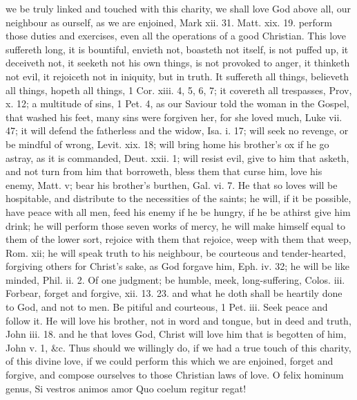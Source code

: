 {we be truly linked and touched with this charity, we shall love God
above all, our neighbour as ourself, as we are enjoined, Mark xii. 31.
Matt. xix. 19. perform those duties and exercises, even all the
operations of a good Christian.
This love suffereth long, it is bountiful, envieth not, boasteth not
itself, is not puffed up, it deceiveth not, it seeketh not his own
things, is not provoked to anger, it thinketh not evil, it rejoiceth
not in iniquity, but in truth. It suffereth all things, believeth all
things, hopeth all things, 1 Cor. xiii. 4, 5, 6, 7; it covereth all
trespasses, Prov, x. 12; a multitude of sins, 1 Pet. 4, as our Saviour
told the woman in the Gospel, that washed his feet, many sins were
forgiven her, for she loved much, Luke vii. 47; it will defend the
fatherless and the widow, Isa. i. 17; will seek no revenge, or be
mindful of wrong, Levit. xix. 18; will bring home his brother's ox if
he go astray, as it is commanded, Deut. xxii. 1; will resist evil, give
to him that asketh, and not turn from him that borroweth, bless them
that curse him, love his enemy, Matt. v; bear his brother's burthen,
Gal. vi. 7. He that so loves will be hospitable, and distribute to the
necessities of the saints; he will, if it be possible, have peace with
all men, feed his enemy if he be hungry, if he be athirst give him
drink; he will perform those seven works of mercy, he will make himself
equal to them of the lower sort, rejoice with them that rejoice, weep
with them that weep, Rom. xii; he will speak truth to his neighbour, be
courteous and tender-hearted, forgiving others for Christ's sake, as
God forgave him, Eph. iv. 32; he will be like minded, Phil. ii. 2. Of
one judgment; be humble, meek, long-suffering, Colos. iii. Forbear,
forget and forgive, xii. 13. 23. and what he doth shall be heartily
done to God, and not to men. Be pitiful and courteous, 1 Pet. iii. Seek
peace and follow it. He will love his brother, not in word and tongue,
but in deed and truth, John iii. 18. and he that loves God, Christ will
love him that is begotten of him, John v. 1, \&c. Thus should we
willingly do, if we had a true touch of this charity, of this divine
love, if we could perform this which we are enjoined, forget and
forgive, and compose ourselves to those Christian laws of love.
O felix hominum genus,
Si vestros animos amor
Quo coelum regitur regat!

}
